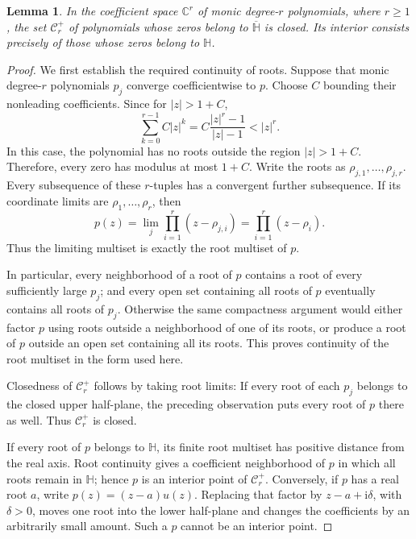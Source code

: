 \documentclass[reqno, 12pt]{article}
\numberwithin{equation}{section}
\newtheorem{lemma}[theorem]{Lemma}
\theoremstyle{definition}
\newcommand{\CC}{\mathbb C}
\begin{document}
\begin{lemma}\label{st:root-continuity}
In the coefficient space $\CC^r$ of monic degree-$r$ polynomials,
where $r\geq1$, the set $\mathcal C_r^+$ of polynomials whose zeros
belong to $\overline{\mathbb H}$ is closed.  Its interior consists
precisely of those whose zeros belong to $\mathbb H$.
\end{lemma}
\begin{proof}
We first establish the required continuity of roots.  Suppose that
monic degree-$r$ polynomials $p_j$ converge coefficientwise to $p$. Choose $C$ bounding their nonleading coefficients. 
Since for $|z|>1+C$, 
\[\sum_{k=0}^{r-1}C|z|^k=C\frac{|z|^r-1}{|z|-1}<|z|^r.
\]
In this case, the polynomial has no roots outside the region $|z|>1+C$.
Therefore, every zero has modulus at most $1+C$. 
Write the roots as $\rho_{j,1},\ldots,\rho_{j,r}$.  Every
subsequence of these $r$-tuples has a convergent further subsequence.
If its coordinate limits are $\rho_1,\ldots,\rho_r$, then
\[
p(z)=\lim_j\prod_{i=1}^r(z-\rho_{j,i})
     =\prod_{i=1}^r(z-\rho_i).
\]
Thus the limiting multiset is exactly the root multiset of $p$.

In particular, every neighborhood of a root of $p$ contains a root
of every sufficiently large $p_j$; and every open set containing
all roots of $p$ eventually contains all roots of $p_j$.  Otherwise
the same compactness argument would either factor $p$ using roots
outside a neighborhood of one of its roots, or produce a root of
$p$ outside an open set containing all its roots.
This proves continuity of the root multiset in the form used here.

Closedness of $\mathcal C_r^+$ follows by taking root limits: 
If every root of each $p_j$ belongs to the closed upper half-plane,
the preceding observation puts every root of $p$ there as well.
Thus $\mathcal C_r^+$ is closed.


If every root of $p$ belongs to $\mathbb H$, its finite root multiset has positive distance from the
real axis.  Root continuity gives a coefficient neighborhood of $p$
in which all roots remain in $\mathbb H$; hence $p$ is an interior
point of $\mathcal C_r^+$.  Conversely, if $p$ has a real root $a$,
write $p(z)=(z-a)u(z)$.  Replacing that factor by
$z-a+\mathrm i\delta$, with $\delta>0$, moves one root into the
lower half-plane and changes the coefficients by an arbitrarily
small amount.  Such a $p$ cannot be an interior point.
\end{proof}
\end{document}
